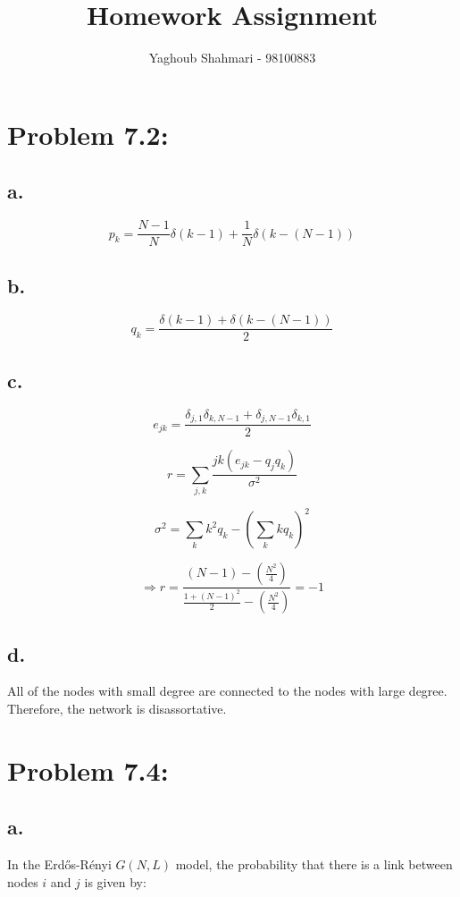 \documentclass{article}
\begin{document}
\title{Homework Assignment}
\author{Yaghoub Shahmari - 98100883}
\date{}
\maketitle

\section*{Problem 7.2:}

\subsection*{a.}
$$ p_k = \frac{N-1}{N}\delta(k-1) + \frac{1}{N}\delta(k-(N-1)) $$

\subsection*{b.}
$$ q_k = \frac{\delta (k-1) + \delta (k-(N-1))}{2} $$

\subsection*{c.}
$$ e_{jk} = \frac{\delta_{j,1}\delta_{k,N-1} + \delta_{j,N-1}\delta_{k,1}}{2} $$

$$ r = \sum_{j,k}\frac{jk(e_{jk}-q_j q_k)}{\sigma^2} $$

$$ \sigma^2 = \sum_k k^2q_k - \left(\sum_k kq_k\right)^2 $$

$$ \Rightarrow r = \frac{(N-1)-\left(\frac{N^2}{4}\right)}{\frac{1+(N-1)^2}{2}-\left(\frac{N^2}{4}\right)} = -1 $$

\subsection*{d.}
All of the nodes with small degree are connected to the nodes with large degree. Therefore, the network is disassortative.

\section*{Problem 7.4:}

\subsection*{a.}
In the Erdős-Rényi $G(N,L)$ model, the probability that there is a link between nodes $i$ and $j$ is given by:
\end{document}
